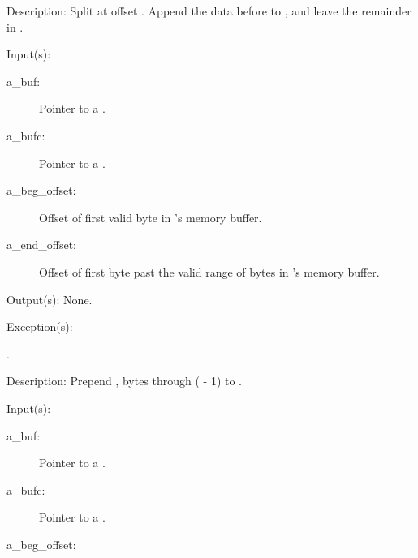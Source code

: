 \begin{capi}
\begin{capilist}
\begin{description}
		\end{description}
	\item[Description: ]
		Split  at offset .  Append the data
		before  to , and leave the remainder
		in .
	\end{capilist}
\label{buf_bufc_prepend}
	\begin{capilist}
	\item[Input(s): ]
		\begin{description}\item[]
		\item[a\_buf: ]
			Pointer to a .
		\item[a\_bufc: ]
			Pointer to a .
		\item[a\_beg\_offset: ]
			Offset of first valid byte in 's memory
			buffer.
		\item[a\_end\_offset: ]
			Offset of first byte past the valid range of bytes in
			's memory buffer.
		\end{description}
	\item[Output(s): ] None.
	\item[Exception(s): ]
		\begin{description}\item[]
		\item[.]
		\end{description}
	\item[Description: ]
		Prepend , bytes  through
		( - 1) to .
	\end{capilist}
\label{buf_bufc_append}
	\begin{capilist}
	\item[Input(s): ]
		\begin{description}\item[]
		\item[a\_buf: ]
			Pointer to a \classname{buf}.
		\item[a\_bufc: ]
			Pointer to a \classname{bufc}.
		\item[a\_beg\_offset: ]

\end{description}
\end{capilist}
\end{capi}
